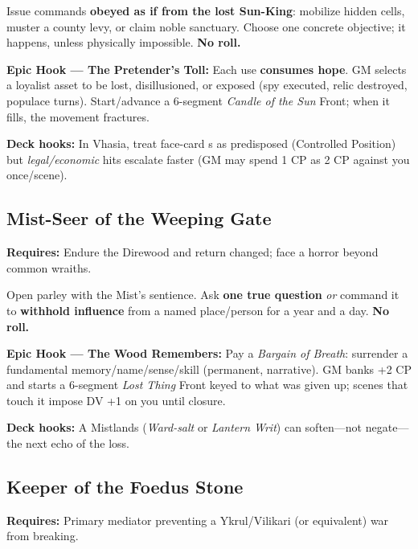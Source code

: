 \begin{tcolorbox}[enhanced,sharp corners,boxrule=.6pt,title={Talent — The Sunburst Warrant (18 XP, 1/campaign)}]
Issue commands \textbf{obeyed as if from the lost Sun-King}: mobilize hidden cells, muster a county levy, or claim noble sanctuary. Choose one concrete objective; it happens, unless physically impossible. \textbf{No roll.}
\end{tcolorbox}

\textbf{Epic Hook — The Pretender’s Toll:} Each use \textbf{consumes hope}. GM selects a loyalist asset to be lost, disillusioned, or exposed (spy executed, relic destroyed, populace turns). Start/advance a 6-segment \emph{Candle of the Sun} Front; when it fills, the movement fractures.

\textbf{Deck hooks:} In Vhasia, treat face-card \SuitHeart{}s as predisposed (Controlled Position) but \SuitClub{} \emph{legal/economic} hits escalate faster (GM may spend 1 CP as 2 CP against you once/scene).

\subsection{Mist-Seer of the Weeping Gate}
\textbf{Requires:} Endure the Direwood and return changed; face a horror beyond common wraiths.

\begin{tcolorbox}[enhanced,sharp corners,boxrule=.6pt,title={Talent — Bargain with the Deep Mist (20 XP, 1/campaign)}]
Open parley with the Mist’s sentience. Ask \textbf{one true question} \emph{or} command it to \textbf{withhold influence} from a named place/person for a year and a day. \textbf{No roll.}
\end{tcolorbox}

\textbf{Epic Hook — The Wood Remembers:} Pay a \emph{Bargain of Breath}: surrender a fundamental memory/name/sense/skill (permanent, narrative). GM banks +2 CP and starts a 6-segment \emph{Lost Thing} Front keyed to what was given up; scenes that touch it impose DV +1 on you until closure.

\textbf{Deck hooks:} A Mistlands \SuitDiamond{} (\emph{Ward-salt} or \emph{Lantern Writ}) can soften—not negate—the next echo of the loss.

\subsection{Keeper of the Foedus Stone}
\textbf{Requires:} Primary mediator preventing a Ykrul/Vilikari (or equivalent) war from breaking.

